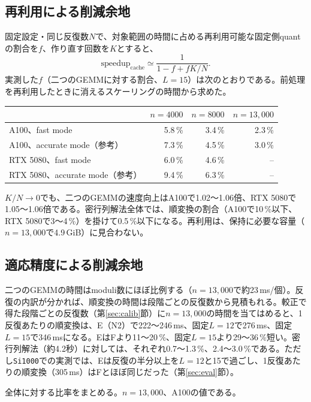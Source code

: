 \documentclass[a4paper,11pt]{ltjsarticle}
\newcommand{\code}[1]{\texttt{#1}}
\begin{document}
\subsection{再利用による削減余地}
固定設定・同じ反復数$N$で、対象範囲の時間に占める再利用可能な固定側quantの割合を$f$、作り直す回数を$K$とすると、
\begin{equation}
 \mathrm{speedup}_{\mathrm{cache}}\simeq\frac{1}{1-f+fK/N}.
 \label{eq:amdahl}
\end{equation}
実測した$f$（二つのGEMMに対する割合、$L=15$）は次のとおりである。前処理を再利用したときに消えるスケーリングの時間から求めた。

\noindent\begin{tabularx}{\linewidth}{@{}Yrrr@{}}
\toprule
 & $n=4000$ & $n=8000$ & $n=13{,}000$\\
\midrule
A100、fast mode & 5.8\,\% & 3.4\,\% & 2.3\,\%\\
A100、accurate mode（参考） & 7.3\,\% & 4.5\,\% & 3.0\,\%\\
RTX 5080、fast mode & 6.0\,\% & 4.6\,\% & --\\
RTX 5080、accurate mode（参考） & 9.4\,\% & 6.3\,\% & --\\
\bottomrule
\end{tabularx}

\medskip
$K/N\to0$でも、二つのGEMMの速度向上はA100で1.02〜1.06倍、RTX 5080で1.05〜1.06倍である。密行列解法全体では、順変換の割合（A100で10\,\%以下、RTX 5080で3〜4\,\%）を掛けて0.5\,\%以下になる。再利用は、保持に必要な容量（$n=13{,}000$で4.9\,GiB）に見合わない。

\subsection{適応精度による削減余地}
二つのGEMMの時間はmoduli数にほぼ比例する（$n=13{,}000$で約23\,ms/個）。反復の内訳が分かれば、順変換の時間は段階ごとの反復数から見積もれる。較正で得た段階ごとの反復数（第\ref{sec:calib}節）に$n=13{,}000$の時間を当てはめると、1反復あたりの順変換は、E（N2）で222〜246\,ms、固定$L=12$で276\,ms、固定$L=15$で346\,msになる。EはFより11〜20\,\%、固定$L=15$より29〜36\,\%短い。密行列解法（約4.2秒）に対しては、それぞれ0.7〜1.3\,\%、2.4〜3.0\,\%である。ただし\code{Si1000}での実測では、Eは反復の半分以上を$L=12$と15で過ごし、1反復あたりの順変換（305\,ms）はFとほぼ同じだった（第\ref{sec:eval}節）。

全体に対する比率をまとめる。$n=13{,}000$、A100の値である。
\end{document}
